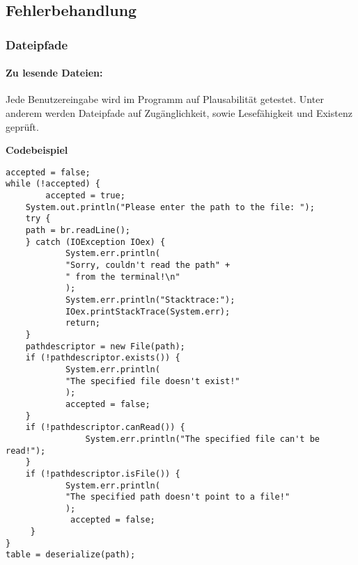 \documentclass[11pt]{article}
\begin{document}
  \subsection{Fehlerbehandlung}
  \subsubsection{Dateipfade}
  \paragraph{Zu lesende Dateien:} 
  Jede Benutzereingabe wird im Programm auf Plausabilität getestet. 
  Unter anderem werden Dateipfade auf Zugänglichkeit, sowie Lesefähigkeit und Existenz geprüft.\\
\begin{samepage}
  \textbf{Codebeispiel}
\begin{lstlisting}[caption=Überprüfung eines Eingabedateipfads, label=lst:InputPathValidation]
accepted = false;
while (!accepted) {
        accepted = true;
    System.out.println("Please enter the path to the file: ");
    try {
    path = br.readLine();
    } catch (IOException IOex) {
            System.err.println(
            "Sorry, couldn't read the path" + 
            " from the terminal!\n"
            );
            System.err.println("Stacktrace:");
            IOex.printStackTrace(System.err);
            return;
    }
    pathdescriptor = new File(path);
    if (!pathdescriptor.exists()) {
            System.err.println(
            "The specified file doesn't exist!"
            );
            accepted = false;
    }
    if (!pathdescriptor.canRead()) {
                System.err.println("The specified file can't be read!");
    }
    if (!pathdescriptor.isFile()) {
            System.err.println(
            "The specified path doesn't point to a file!"
            );
             accepted = false;
     }
}
table = deserialize(path);
\end{lstlisting}
\end{samepage}
\pagebreak
\end{document}
